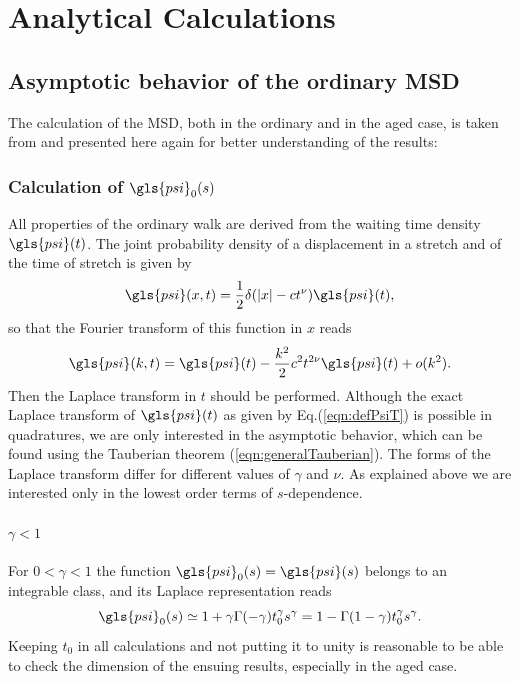 \chapter{Analytical Calculations}

\section{Asymptotic behavior of the ordinary MSD}

The calculation of the MSD, both in the ordinary and in the aged case, is taken from \cite{bothe} and presented here again for better understanding of the results:

\subsection*{Calculation of $\gls{psi}_0(s)$}

All properties of the ordinary walk are derived from the waiting time density $\gls{psi}(t)$. The joint probability density of a displacement in a stretch and of the time of stretch is given by
%
\begin{equation}
 \gls{psi}(x,t) = \frac{1}{2} \delta(|x| - ct^\nu ) \gls{psi}(t),
\end{equation}
%
so that the Fourier transform of this function in $x$ reads
\begin{equation}
 \gls{psi}(k,t) = \gls{psi}(t) - \frac{k^2}{2} c^2 t^{2 \nu} \gls{psi}(t) + o(k^2). 
\end{equation}
%
Then the Laplace transform in $t$ should be performed.  Although the exact Laplace transform of $\gls{psi}(t)$ as given by Eq.(\ref{eqn:defPsiT}) is possible in quadratures, we are only interested in the asymptotic behavior, which can be found using the Tauberian theorem (\ref{eqn:generalTauberian}). The forms of the Laplace transform 
differ for different values of $\gamma$ and $\nu$. As explained above we are interested only in the lowest order terms of $s$-dependence. 

\subsubsection*{$ \gamma<1$}
For $0<\gamma <1$ the function $ \gls{psi}_0(s) = \gls{psi}(s)$ belongs to an integrable class, and its Laplace representation reads
\begin{equation}
 \gls{psi}_0(s) \simeq 1 + \gamma \Gamma(-\gamma) t_0^\gamma s^\gamma 
 = 1-\Gamma(1-\gamma) t_0^\gamma s^\gamma. \label{eqn:psi0GammaSmall}
\end{equation}
Keeping $t_0$ in all calculations and not putting it to unity is reasonable to be able to check the dimension of the ensuing results, especially in the aged case. 

